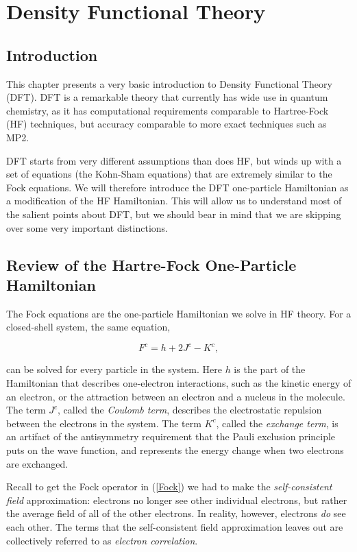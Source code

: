 \chapter{Density Functional Theory}

\section{Introduction}
This chapter presents a very basic introduction to Density Functional
Theory (DFT). DFT is a remarkable theory that currently has wide use
in quantum chemistry, as it has computational requirements comparable to
Hartree-Fock (HF) techniques, but accuracy comparable to more exact
techniques such as MP2.

DFT starts from very different assumptions than does HF, but winds up
with a set of equations (the Kohn-Sham equations) that are extremely
similar to the Fock equations. We will therefore introduce the DFT
one-particle Hamiltonian as a modification of the HF Hamiltonian. This
will allow us to understand most of the salient points about DFT, but
we should bear in mind that we are skipping over some very important
distinctions. 

\section{Review of the Hartre-Fock One-Particle Hamiltonian}
The Fock equations are the one-particle Hamiltonian we solve in HF
theory. For a closed-shell system, the same equation,

\begin{equation}
	F^c = h + 2J^c - K^c,
\label{Fock}
\end{equation}

\noindent can be solved for every particle in the system. Here $h$ is
the part of the Hamiltonian that describes one-electron interactions,
such as the kinetic energy of an electron, or the attraction between
an electron and a nucleus in the molecule. The term $J^c$, called the
\emph{Coulomb term}, describes
the electrostatic repulsion between the electrons in the system. The
term $K^c$, called the \emph{exchange term}, is an artifact of the
antisymmetry requirement that the Pauli exclusion principle puts on
the wave function, and represents the energy change when two electrons
are exchanged.

Recall to get the Fock operator in (\ref{Fock}) we had to make the
\emph{self-consistent field} approximation: electrons no longer see
other individual electrons, but rather the average field of all of the
other electrons. In reality, however, electrons \emph{do} see each
other. The terms that the self-consistent field approximation leaves
out are collectively referred to as \emph{electron correlation}. 

